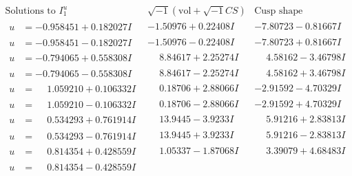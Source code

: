 \documentclass[1p]{elsarticle_modified}
\theoremstyle{definition}
\newcommand{\I}{\sqrt{-1}}
\begin{document}
$$\begin{array}{c|c|c}  
\text{Solutions to }I^u_{1}& \I (\text{vol} + \sqrt{-1}CS) & \text{Cusp shape}\\
 \hline 
\begin{aligned}
u &= -0.958451 + 0.182027 I\end{aligned}
 & -1.50976 + 0.22408 I & -7.80723 - 0.81667 I \\ \hline\begin{aligned}
u &= -0.958451 - 0.182027 I\end{aligned}
 & -1.50976 - 0.22408 I & -7.80723 + 0.81667 I \\ \hline\begin{aligned}
u &= -0.794065 + 0.558308 I\end{aligned}
 & \phantom{-}8.84617 + 2.25274 I & \phantom{-}4.58162 - 3.46798 I \\ \hline\begin{aligned}
u &= -0.794065 - 0.558308 I\end{aligned}
 & \phantom{-}8.84617 - 2.25274 I & \phantom{-}4.58162 + 3.46798 I \\ \hline\begin{aligned}
u &= \phantom{-}1.059210 + 0.106332 I\end{aligned}
 & \phantom{-}0.18706 + 2.88066 I & -2.91592 - 4.70329 I \\ \hline\begin{aligned}
u &= \phantom{-}1.059210 - 0.106332 I\end{aligned}
 & \phantom{-}0.18706 - 2.88066 I & -2.91592 + 4.70329 I \\ \hline\begin{aligned}
u &= \phantom{-}0.534293 + 0.761914 I\end{aligned}
 & \phantom{-}13.9445 - 3.9233 I & \phantom{-}5.91216 + 2.83813 I \\ \hline\begin{aligned}
u &= \phantom{-}0.534293 - 0.761914 I\end{aligned}
 & \phantom{-}13.9445 + 3.9233 I & \phantom{-}5.91216 - 2.83813 I \\ \hline\begin{aligned}
u &= \phantom{-}0.814354 + 0.428559 I\end{aligned}
 & \phantom{-}1.05337 - 1.87068 I & \phantom{-}3.39079 + 4.68483 I \\ \hline\begin{aligned}
u &= \phantom{-}0.814354 - 0.428559 I\end{aligned}

\end{array}$$
\end{document}
